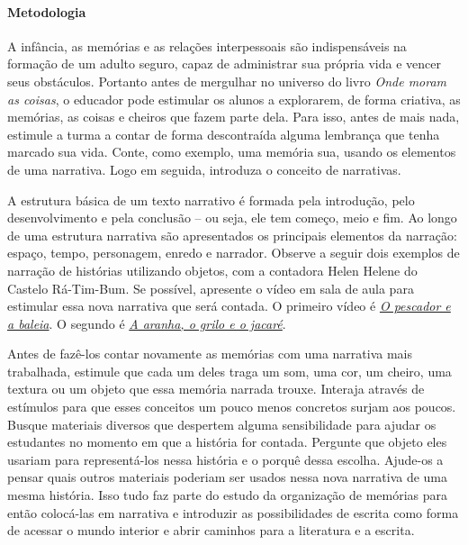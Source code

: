 \documentclass[11pt]{extarticle}
\begin{document}
\paragraph{Metodologia} A infância, as memórias e as relações interpessoais são indispensáveis na formação de um adulto seguro, capaz de administrar sua própria vida e vencer seus obstáculos. Portanto antes de mergulhar no universo do livro \textit{Onde moram as coisas}, o educador pode estimular os alunos a explorarem, de forma criativa, as memórias, as coisas e cheiros que fazem parte dela. Para isso, antes de mais nada, estimule a turma a contar de forma descontraída alguma lembrança que tenha marcado sua vida. Conte, como exemplo, uma memória sua, usando os elementos de uma narrativa. Logo em seguida, introduza o conceito de narrativas. 

A estrutura básica de um texto narrativo é formada pela introdução, pelo desenvolvimento e pela conclusão -- ou seja, ele tem começo, meio e fim. Ao longo de uma estrutura narrativa são apresentados os principais elementos da narração: espaço, tempo, personagem, enredo e narrador. Observe a seguir dois exemplos de narração de histórias utilizando objetos, com a contadora Helen Helene do Castelo Rá-Tim-Bum. Se possível, apresente o vídeo em sala de aula para estimular essa nova narrativa que será contada. O primeiro vídeo é \href{https://youtu.be/QEI_iViH3Ok}{\textit{O pescador e a baleia}}. O segundo é \href{https://youtu.be/xfv4U0V2PCk}{\textit{A aranha, o grilo e o jacaré}}. 


Antes de fazê-los contar novamente as memórias com uma narrativa mais trabalhada, estimule que cada um deles traga um som, uma cor, um cheiro, uma textura ou um objeto que essa memória narrada trouxe. Interaja através de estímulos para que esses conceitos um pouco menos concretos surjam aos poucos. Busque materiais diversos que despertem alguma sensibilidade para ajudar os estudantes no momento em que a história for contada. Pergunte que objeto eles usariam para representá-los nessa história e o porquê dessa escolha. Ajude-os a pensar quais outros materiais poderiam ser usados nessa nova narrativa de uma mesma história. Isso tudo faz parte do estudo da organização de memórias para então colocá-las em narrativa e introduzir as possibilidades de escrita como forma de acessar o mundo interior e abrir caminhos para a literatura e a escrita. 
\end{document}

